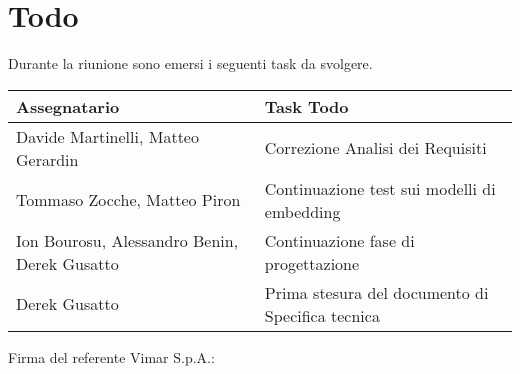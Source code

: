\section{Todo}
Durante la riunione sono emersi i seguenti task da svolgere.

\begin{center}
  \begin{tabular}{|L{5cm}|L{8cm}|}
    \hline
    \textbf{Assegnatario} & \textbf{Task Todo} \\ \hline
      Davide Martinelli, Matteo Gerardin & Correzione Analisi dei Requisiti \\ \hline
      Tommaso Zocche, Matteo Piron & Continuazione test sui modelli di embedding \\ \hline
      Ion Bourosu, Alessandro Benin, Derek Gusatto & Continuazione fase di progettazione \\ \hline
      Derek Gusatto & Prima stesura del documento di Specifica tecnica \\ \hline
  \end{tabular}
\end{center}

\vspace{4cm}
\noindent Firma del referente Vimar S.p.A.: \underline{\hspace{5cm}}